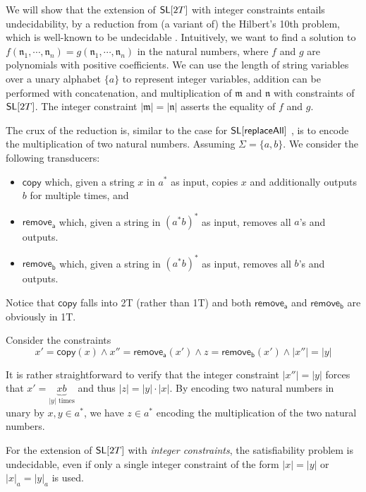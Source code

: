 We will show that the extension of $\mathsf{SL}[2T]$ with integer constraints entails undecidability, by a reduction from (a variant of) the Hilbert's 10th problem, which is well-known to be undecidable \cite{Mat93}. 
Intuitively, we want to find a solution to $f(\mathfrak{n}_1, \cdots, \mathfrak{n}_n)=g(\mathfrak{n}_1, \cdots, \mathfrak{n}_n)$ in the natural numbers, where $f$ and $g$ are polynomials with positive coefficients.
We can use the length of string variables over a unary alphabet $\{a\}$ to represent integer variables, addition can be performed with concatenation, and multiplication of $\mathfrak{m}$ and $\mathfrak{n}$ with constraints of $\mathsf{SL}[2T]$.
The integer constraint $|\mathfrak{m}| = |\mathfrak{n}|$ asserts the equality of $f$ and $g$.

The crux of the reduction is, similar to the case for $\mathsf{SL}[\mathsf{replaceAll}]$ \cite{CCHLW18}, is to encode the multiplication of two natural numbers. Assuming $\Sigma=\{a,b\}$. We consider the following transducers:
\begin{itemize}
	\item $\mathsf{copy}$ which, given a string $x$ in $a^*$ as input, copies $x$ and additionally outputs $b$ for multiple times, and 
	
	\item $\mathsf{remove_a}$ which, given a string in $(a^*b)^*$ as input, removes all $a$'s and outputs.  
	
	\item $\mathsf{remove_b}$ which, given a string in $(a^*b)^*$ as input, removes all $b$'s and outputs.
\end{itemize}
 Notice that $\mathsf{copy}$ falls into 2T (rather than 1T) and both $\mathsf{remove_a}$ and $\mathsf{remove_b}$ are obviously in 1T. 
 
Consider the constraints 
$$x'=\mathsf{copy}(x) \wedge x''=\mathsf{remove_a}(x') \wedge  z=\mathsf{remove_b}(x') \wedge |x''|=|y|$$

It is rather straightforward to verify that the integer constraint $|x''|=|y|$ forces that $x'=\underbrace{xb}_{|y|\text{ times}}$ %
	and thus $|z|=|y|\cdot |x|$. By encoding two natural numbers in unary by $x,y\in a^*$, we have $z\in a^*$ encoding the multiplication of the two natural numbers. 
	

\begin{theorem}\label{thm-ext-int}
	For the extension of $\mathsf{SL}[2T]$ with \emph{integer constraints}, the satisfiability problem is undecidable, even if only a single integer constraint of the form $|x| = |y|$ or $|x|_a = |y|_a$ is used.
\end{theorem}

